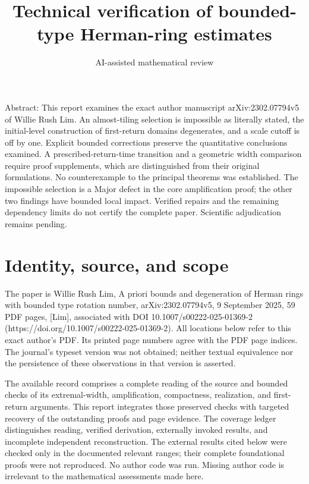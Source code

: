 \documentclass[10pt]{article}
\title{Technical verification of bounded-type Herman-ring estimates}
\author{AI-assisted mathematical review}
\date{}
\begin{document}
\maketitle
Abstract: This report examines the exact author manuscript arXiv:2302.07794v5 of Willie Rush Lim. An almost-tiling selection is impossible as literally stated, the initial-level construction of first-return domains degenerates, and a scale cutoff is off by one. Explicit bounded corrections preserve the quantitative conclusions examined. A prescribed-return-time transition and a geometric width comparison require proof supplements, which are distinguished from their original formulations. No counterexample to the principal theorems was established. The impossible selection is a Major defect in the core amplification proof; the other two findings have bounded local impact. Verified repairs and the remaining dependency limits do not certify the complete paper. Scientific adjudication remains pending.\par
\section*{Identity, source, and scope}
The paper is Willie Rush Lim, A priori bounds and degeneration of Herman rings with bounded type rotation number, arXiv:2302.07794v5, 9 September 2025, 59 PDF pages, [Lim], associated with DOI 10.1007/s00222-025-01369-2 (https://doi.org/10.1007/s00222-025-01369-2). All locations below refer to this exact author’s PDF. Its printed page numbers agree with the PDF page indices. The journal’s typeset version was not obtained; neither textual equivalence nor the persistence of these observations in that version is asserted.\par
The available record comprises a complete reading of the source and bounded checks of its extremal-width, amplification, compactness, realization, and first-return arguments. This report integrates those preserved checks with targeted recovery of the outstanding proofs and page evidence. The coverage ledger distinguishes reading, verified derivation, externally invoked results, and incomplete independent reconstruction. The external results cited below were checked only in the documented relevant ranges; their complete foundational proofs were not reproduced. No author code was run. Missing author code is irrelevant to the mathematical assessments made here.\par
\end{document}
